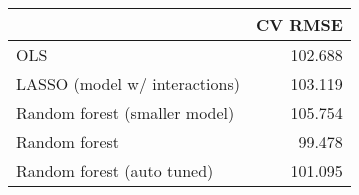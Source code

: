 
\begin{tabular}{lr}
\toprule
  & CV RMSE\\
\midrule
OLS & 102.688\\
LASSO (model w/ interactions) & 103.119\\
Random forest (smaller model) & 105.754\\
Random forest & 99.478\\
Random forest (auto tuned) & 101.095\\
\bottomrule
\end{tabular}